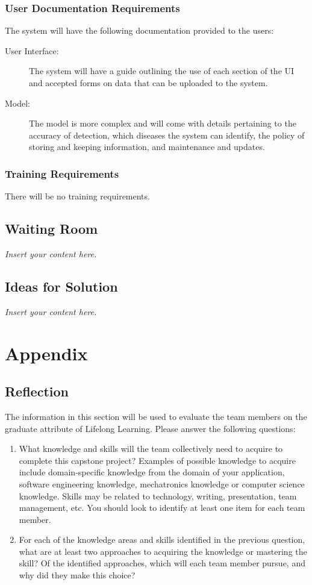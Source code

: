 \documentclass[12pt]{article}
\newcommand{\lips}{\textit{Insert your content here.}}
\begin{document}
\subsubsection{User Documentation Requirements}
The system will have the following documentation provided to the users:
\begin{description}
    \item[User Interface:] The system will have a guide outlining the use of each section of the UI and accepted forms on data that can be uploaded to the system.  
    \item[Model:] The model is more complex and will come with details pertaining to the accuracy of detection, which diseases the system can identify, the policy of storing and keeping information, and maintenance and updates.
\end{description}


\subsubsection{Training Requirements}
There will be no training requirements.


\subsection{Waiting Room}
\lips

\subsection{Ideas for Solution}
\lips




\newpage{}
\section{Appendix}

\subsection{Reflection}
The information in this section will be used to evaluate the team members on the
graduate attribute of Lifelong Learning.  Please answer the following questions:

\begin{enumerate}
  \item What knowledge and skills will the team collectively need to acquire to
  complete this capstone project?  Examples of possible knowledge
  to acquire include domain-specific knowledge from the domain of your
  application, software engineering knowledge, mechatronics knowledge or
  computer science knowledge.  Skills may be related to technology, writing,
  presentation, team management, etc.  You should look to identify at
  least one item for each team member.
  \item For each of the knowledge areas and skills identified in the previous
  question, what are at least two approaches to acquiring the knowledge or
  mastering the skill?  Of the identified approaches, which will each team
  member pursue, and why did they make this choice?
\end{enumerate}
\end{document}
